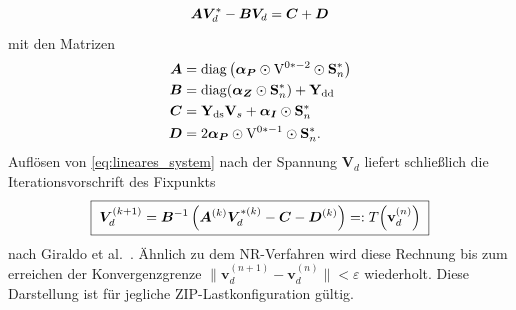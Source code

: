 \begin{equation}
	\boldsymbol{A}\boldsymbol{V}_d^* - \boldsymbol{B}\boldsymbol{V}_d = \boldsymbol{C} + \boldsymbol{D}
	\label{eq:lineares_system}
\end{equation}
mit den Matrizen
\begin{align}
	\boldsymbol{A} &= \operatorname{diag}\left(\boldsymbol{\alpha_P} \odot \mathrm{V}^{0*-2} \odot \mathbf{S}_n^*\right) \label{eq:giraldo_A}\\
	\boldsymbol{B} &= \operatorname{diag}(\boldsymbol{\alpha_Z} \odot \mathbf{S}_n^*) + \mathbf{\mathbf{Y}_{\mathrm{dd}}} \label{eq:giraldo_B}\\
	\boldsymbol{C} &= \mathbf{\mathbf{Y}_{\mathrm{ds}}} \mathbf{V}_s + \boldsymbol{\alpha_I} \odot \mathbf{S}_n^* \label{eq:giraldo_C}\\
	\boldsymbol{D} &= 2\boldsymbol{\alpha_P} \odot \mathrm{V}^{0*-1} \odot \mathbf{S}_n^* \label{eq:giraldo_D}.
\end{align}
Auflösen von \eqref{eq:lineares_system} nach der Spannung $\mathbf{V}_d$ liefert schließlich die Iterationsvorschrift des Fixpunkts
\begin{equation}
	\label{eq:fpi_iteration}
	\boxed{\;	\boldsymbol{V}_d^{(k+1)} = \boldsymbol{B}^{-1}\left(\boldsymbol{A}^{(k)} \boldsymbol{V}_d^{*(k)} - \boldsymbol{C} - \boldsymbol{D}^{(k)}\right) =: T\!\left(\mathbf{v}_d^{(n)}\right)\;}
\end{equation}
nach Giraldo et al.~\cite{Giraldo2022}.
Ähnlich zu dem NR-Verfahren wird diese Rechnung bis zum erreichen der Konvergenzgrenze $\|\mathbf{v}_d^{(n+1)} - \mathbf{v}_d^{(n)}\| < \varepsilon$ wiederholt.
Diese Darstellung ist für jegliche ZIP-Lastkonfiguration gültig. 

